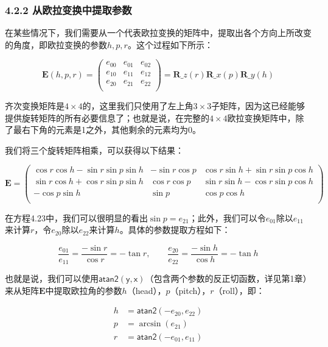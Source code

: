 \documentclass[
  paper=a4,
  ,captions=tableheading
]{scrartcl}
\begin{document}
\subsubsection{4.2.2
  从欧拉变换中提取参数}\label{ux4eceux6b27ux62c9ux53d8ux6362ux4e2dux63d0ux53d6ux53c2ux6570}

在某些情况下，我们需要从一个代表欧拉变换的矩阵中，提取出各个方向上所改变的角度，即欧拉变换的参数\(h,p,r\)。这个过程如下所示：

\[
  \mathbf{E}(h,p,r) =
  \left(
  \begin{array}{ccc}
      e_{00} & e_{01} & e_{02} \\
      e_{10} & e_{11} & e_{12} \\
      e_{20} & e_{21} & e_{22} \\
    \end{array}
  \right)
  = \mathbf{R}\_z(r) \mathbf{R}\_x(p)\mathbf{R}\_y(h) \tag{4.22}
\]

齐次变换矩阵是\(4 \times 4\)的，这里我们只使用了左上角\(3 \times 3\)子矩阵，因为这已经能够提供旋转矩阵的所有必要信息了；也就是说，在完整的\(4 \times 4\)欧拉变换矩阵中，除了最右下角的元素是1之外，其他剩余的元素均为0。

我们将三个旋转矩阵相乘，可以获得以下结果：

\[
  \mathbf{E}=
  \left(
  \begin{array}{ccc}
      \cos r \cos h - \sin r \sin p \sin h & - \sin r \cos p & \cos r \sin h + \sin r \sin p \cos h \\
      \sin r \cos h + \cos r \sin p \sin h & \cos r \cos p   & \sin r \sin h - \cos r \sin p \cos h \\
      -\cos p \sin h                       & \sin p          & \cos p \cos h                        \\
    \end{array}
  \right)
  \tag{4.23}
\]


在方程4.23中，我们可以很明显的看出\(\sin p = e_{21}\)；此外，我们可以令\(e_{01}\)除以\(e_{11}\)来计算\(r\)，令\(e_{20}\)除以\(e_{22}\)来计算\(h\)。具体的参数提取方程如下：

\[
  \frac{e_{01}}{e_{11}} =
  \frac{-\sin r}{\cos r} = -\tan r ,\qquad
  \frac{e_{20}}{e_{22}} =
  \frac{-\sin h}{\cos h} = -\tan h
  \tag{4.24}
\]

也就是说，我们可以使用\(\mathsf{atan2(y,x)}\)（包含两个参数的反正切函数，详见第1章）来从矩阵\(\mathbf{E}\)中提取欧拉角的参数\(h\)（head），\(p\)（pitch），\(r\)（roll），即：

\[
  \begin{aligned}{}
    h & = \mathsf{atan2}(-e_{20},e_{22}) \\
    p & = \arcsin (e_{21})               \\
    r & = \mathsf{atan2}(-e_{01},e_{11}) \\
  \end{aligned}
  \tag{4.25}
\]
\end{document}
